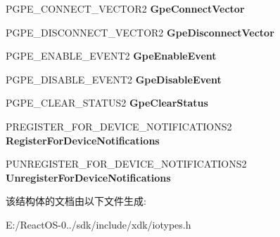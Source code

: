 \begin{DoxyCompactItemize}
P\+G\+P\+E\+\_\+\+C\+O\+N\+N\+E\+C\+T\+\_\+\+V\+E\+C\+T\+O\+R2 {\bfseries Gpe\+Connect\+Vector}
\item 
\mbox{\label{struct___a_c_p_i___i_n_t_e_r_f_a_c_e___s_t_a_n_d_a_r_d2_a455b39a50d628e22b7fc5e4969cebeba}} 
P\+G\+P\+E\+\_\+\+D\+I\+S\+C\+O\+N\+N\+E\+C\+T\+\_\+\+V\+E\+C\+T\+O\+R2 {\bfseries Gpe\+Disconnect\+Vector}
\item 
\mbox{\label{struct___a_c_p_i___i_n_t_e_r_f_a_c_e___s_t_a_n_d_a_r_d2_acfafeb895147d3639c95102de7355983}} 
P\+G\+P\+E\+\_\+\+E\+N\+A\+B\+L\+E\+\_\+\+E\+V\+E\+N\+T2 {\bfseries Gpe\+Enable\+Event}
\item 
\mbox{\label{struct___a_c_p_i___i_n_t_e_r_f_a_c_e___s_t_a_n_d_a_r_d2_a6c11f4b23a3609d9b0556ae63bf73fc8}} 
P\+G\+P\+E\+\_\+\+D\+I\+S\+A\+B\+L\+E\+\_\+\+E\+V\+E\+N\+T2 {\bfseries Gpe\+Disable\+Event}
\item 
\mbox{\label{struct___a_c_p_i___i_n_t_e_r_f_a_c_e___s_t_a_n_d_a_r_d2_a279d39abf19640bd6dda6ea19555c3bb}} 
P\+G\+P\+E\+\_\+\+C\+L\+E\+A\+R\+\_\+\+S\+T\+A\+T\+U\+S2 {\bfseries Gpe\+Clear\+Status}
\item 
\mbox{\label{struct___a_c_p_i___i_n_t_e_r_f_a_c_e___s_t_a_n_d_a_r_d2_a8ab05ad8c485871c156d3a6beb35a4b7}} 
P\+R\+E\+G\+I\+S\+T\+E\+R\+\_\+\+F\+O\+R\+\_\+\+D\+E\+V\+I\+C\+E\+\_\+\+N\+O\+T\+I\+F\+I\+C\+A\+T\+I\+O\+N\+S2 {\bfseries Register\+For\+Device\+Notifications}
\item 
\mbox{\label{struct___a_c_p_i___i_n_t_e_r_f_a_c_e___s_t_a_n_d_a_r_d2_a72279d6dc8b30b0ebbcdb8d30ab40ff2}} 
P\+U\+N\+R\+E\+G\+I\+S\+T\+E\+R\+\_\+\+F\+O\+R\+\_\+\+D\+E\+V\+I\+C\+E\+\_\+\+N\+O\+T\+I\+F\+I\+C\+A\+T\+I\+O\+N\+S2 {\bfseries Unregister\+For\+Device\+Notifications}
\end{DoxyCompactItemize}


该结构体的文档由以下文件生成\+:\begin{DoxyCompactItemize}
\item 
E\+:/\+React\+O\+S-\/0../sdk/include/xdk/iotypes.\+h\end{DoxyCompactItemize}
